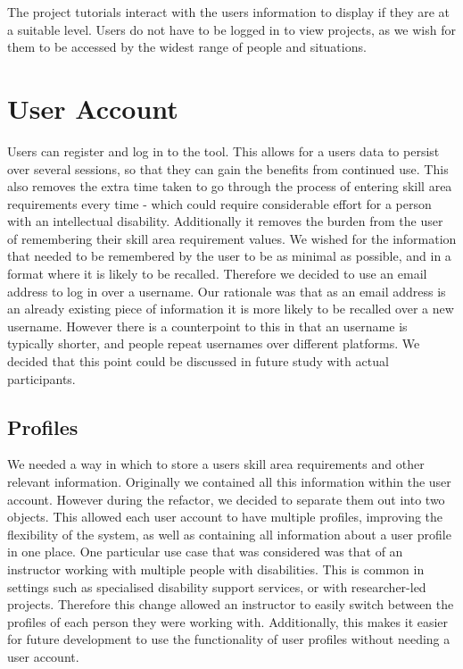\documentclass{l4proj}
\begin{document}
The project tutorials interact with the users information to display if they are at a suitable level. Users do not have to be logged in to view projects, as we wish for them to be accessed by the widest range of people and situations.


\section{User Account}
Users can register and log in to the tool. This allows for a users data to persist over several sessions, so that they can gain the benefits from continued use. This also removes the extra time taken to go through the process of entering skill area requirements every time - which could require considerable effort for a person with an intellectual disability. Additionally it removes the burden from the user of remembering their skill area requirement values. 
We wished for the information that needed to be remembered by the user to be as minimal as possible, and in a format where it is likely to be recalled. Therefore we decided to use an email address to log in over a username. Our rationale was that as an email address is an already existing piece of information it is more likely to be recalled over a new username. However there is a counterpoint to this in that an username is typically shorter, and people repeat usernames over different platforms. We decided that this point could be discussed in future study with actual participants. 

\subsection{Profiles}
We needed a way in which to store a users skill area requirements and other relevant information. Originally we contained all this information within the user account. However during the refactor, we decided to separate them out into two objects. This allowed each user account to have multiple profiles, improving the flexibility of the system, as well as containing all information about a user profile in one place. One particular use case that was considered was that of an instructor working with multiple people with disabilities. This is common in settings such as specialised disability support services, or with researcher-led projects. Therefore this change allowed an instructor to easily switch between the profiles of each person they were working with.  Additionally, this makes it easier for future development to use the functionality of user profiles without needing a user account.
\end{document}
